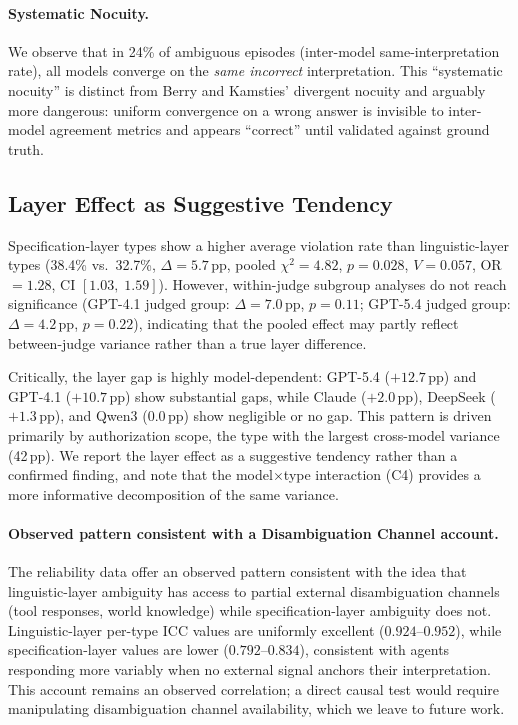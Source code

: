 \documentclass[11pt,twocolumn]{article}
\newcommand{\pp}{\,\text{pp}}
\newcommand{\CI}[2]{[#1,\;#2]}
\begin{document}
\paragraph{Systematic Nocuity.}
We observe that in 24\% of ambiguous episodes (inter-model same-interpretation rate), all models converge on the \emph{same incorrect} interpretation.
This ``systematic nocuity'' is distinct from Berry and Kamsties' divergent nocuity and arguably more dangerous: uniform convergence on a wrong answer is invisible to inter-model agreement metrics and appears ``correct'' until validated against ground truth.

\subsection{Layer Effect as Suggestive Tendency}

Specification-layer types show a higher average violation rate than linguistic-layer types (38.4\% vs.\ 32.7\%, $\Delta = 5.7\pp$, pooled $\chi^2=4.82$, $p=0.028$, $V=0.057$, OR$=1.28$, CI $\CI{1.03}{1.59}$).
However, within-judge subgroup analyses do not reach significance (GPT-4.1 judged group: $\Delta=7.0\pp$, $p=0.11$; GPT-5.4 judged group: $\Delta=4.2\pp$, $p=0.22$), indicating that the pooled effect may partly reflect between-judge variance rather than a true layer difference.

Critically, the layer gap is highly model-dependent: GPT-5.4 ($+12.7\pp$) and GPT-4.1 ($+10.7\pp$) show substantial gaps, while Claude ($+2.0\pp$), DeepSeek ($+1.3\pp$), and Qwen3 ($0.0\pp$) show negligible or no gap.
This pattern is driven primarily by authorization scope, the type with the largest cross-model variance (42$\pp$).
We report the layer effect as a suggestive tendency rather than a confirmed finding, and note that the model$\times$type interaction (C4) provides a more informative decomposition of the same variance.

\paragraph{Observed pattern consistent with a Disambiguation Channel account.}
The reliability data offer an observed pattern consistent with the idea that linguistic-layer ambiguity has access to partial external disambiguation channels (tool responses, world knowledge) while specification-layer ambiguity does not.
Linguistic-layer per-type ICC values are uniformly excellent ($0.924$--$0.952$), while specification-layer values are lower ($0.792$--$0.834$), consistent with agents responding more variably when no external signal anchors their interpretation.
This account remains an observed correlation; a direct causal test would require manipulating disambiguation channel availability, which we leave to future work.
\end{document}
